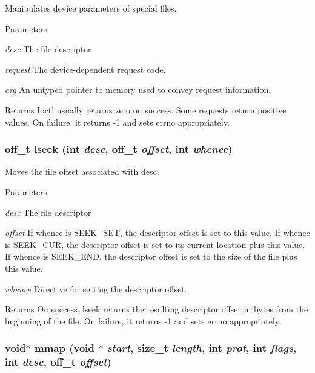 Manipulates device parameters of special files. 
\begin{DoxyParams}{Parameters}
\item[{\em desc}]The file descriptor \item[{\em request}]The device-\/dependent request code. \item[{\em arg}]An untyped pointer to memory used to convey request information. \end{DoxyParams}
\begin{DoxyReturn}{Returns}
Ioctl usually returns zero on success. Some requests return positive values. On failure, it returns -\/1 and sets errno appropriately. 
\end{DoxyReturn}
\hypertarget{group__syscalls_gab953b420ed5fc8595d05e52d5bc5a474}{
\subsubsection[{lseek}]{\setlength{\rightskip}{0pt plus 5cm}off\_\-t lseek (int {\em desc}, \/  off\_\-t {\em offset}, \/  int {\em whence})}}
\label{group__syscalls_gab953b420ed5fc8595d05e52d5bc5a474}
Moves the file offset associated with desc. 
\begin{DoxyParams}{Parameters}
\item[{\em desc}]The file descriptor \item[{\em offset}]If whence is SEEK\_\-SET, the descriptor offset is set to this value. If whence is SEEK\_\-CUR, the descriptor offset is set to its current location plus this value. If whence is SEEK\_\-END, the descriptor offset is set to the size of the file plus this value. \item[{\em whence}]Directive for setting the descriptor offset. \end{DoxyParams}
\begin{DoxyReturn}{Returns}
On success, lseek returns the resulting descriptor offset in bytes from the beginning of the file. On failure, it returns -\/1 and sets errno appropriately. 
\end{DoxyReturn}
\hypertarget{group__syscalls_ga8937a334d42232a0804ed450bb3b8e27}{
\subsubsection[{mmap}]{\setlength{\rightskip}{0pt plus 5cm}void$\ast$ mmap (void $\ast$ {\em start}, \/  size\_\-t {\em length}, \/  int {\em prot}, \/  int {\em flags}, \/  int {\em desc}, \/  off\_\-t {\em offset})}}
